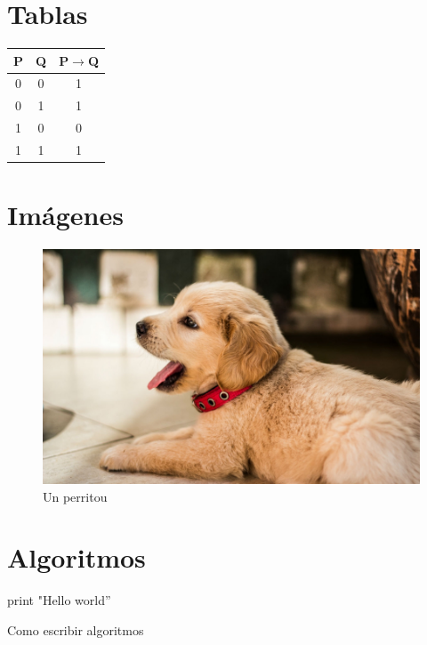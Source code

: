 \documentclass[11pt]{article} %
\begin{document}
\section{Tablas}

\begin{table}[H]
  \centering
  \begin{tabular}{| c | c || c|}
    \hline
    P & Q  & P$\rightarrow$Q \\ \hline
    0 & 0 & 1 \\ \hline
    0 & 1 & 1 \\ \hline          
    1 & 0 & 0 \\ \hline
    1 & 1 & 1 \\ \hline
  \end{tabular}
\end{table}

\section{Imágenes}

\begin{figure}[H] %
  \begin{center}
    \includegraphics[width=450pt]{./perrito.jpg}
    \caption{Un perritou \smiley}
  \end{center}
\end{figure}

\section{Algoritmos \smiley}
\begin{algorithm}[H]
  print "Hello world''\;
  \caption{Como escribir algoritmos}
\end{algorithm}
\end{document}

